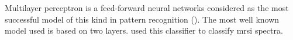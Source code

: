 \begin{enumerate}[leftmargin=*]
Multilayer perceptron is a feed-forward neural networks considered as the most successful model of this kind in pattern recognition (\cite{Bishop2006}). The most well known model used is based on two layers. %
%
%
%
%
%
\cite{Matulewicz2013,Parfait2012} used this classifier to classify \ac{mrsi} spectra.


\end{enumerate}
